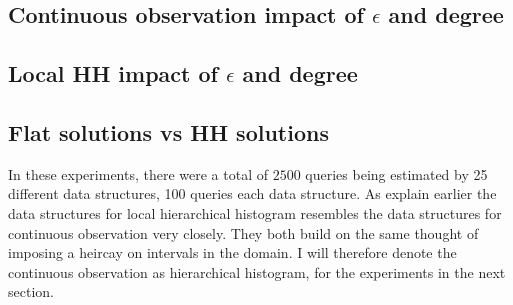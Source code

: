 \documentclass[11pt]{article}
\theoremstyle{definition}
\begin{document}
\subsection{Continuous observation impact of $\epsilon$ and degree}




\subsection{Local HH impact of $\epsilon$ and degree}




\newpage\subsection{Flat solutions vs HH solutions}
In these experiments, there were a total of $2500$ queries being estimated by 25 different data structures, 100 queries each data structure. As explain earlier the data structures for local hierarchical histogram resembles the data structures for continuous observation very closely. They both build on the same thought of imposing a heircay on intervals in the domain. I will therefore denote the continuous observation as hierarchical histogram, for the experiments in the next section.
\end{document}
